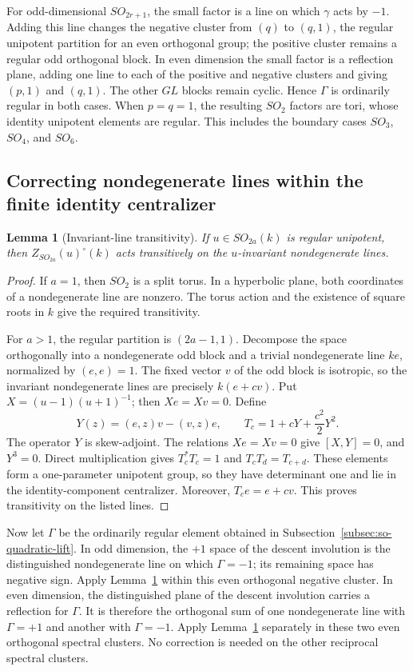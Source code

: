 \documentclass[11pt,a4paper]{article}
\newtheorem{lemma}[theorem]{Lemma}
\theoremstyle{definition}
\theoremstyle{remark}
\begin{document}
For odd-dimensional \(SO_{2r+1}\), the small factor is a line on
which \(\gamma\) acts by \(-1\). Adding this line changes the
negative cluster from \((q)\) to \((q,1)\), the regular
unipotent partition for an even orthogonal group; the positive
cluster remains a regular odd orthogonal block. In even
dimension the small factor is a reflection plane, adding one
line to each of the positive and negative clusters and giving
\((p,1)\) and \((q,1)\). The other \(GL\) blocks remain cyclic.
Hence \(\Gamma\) is ordinarily regular in both cases. When
\(p=q=1\), the resulting \(SO_2\) factors are tori, whose
identity unipotent elements are regular. This includes the
boundary cases \(SO_3\), \(SO_4\), and \(SO_6\).

\subsection{Correcting nondegenerate lines within the finite identity centralizer}
\label{subsec:so-line-correction}

\begin{lemma}[Invariant-line transitivity]\label{lem:so-line}
If \(u\in SO_{2a}(k)\) is regular unipotent, then
\(Z_{SO_{2a}}(u)^\circ(k)\) acts transitively on the
\(u\)-invariant nondegenerate lines.
\end{lemma}

\begin{proof}
If \(a=1\), then \(SO_2\) is a split torus. In a hyperbolic plane,
both coordinates of a nondegenerate line are nonzero. The torus
action and the existence of square roots in \(k\) give the
required transitivity.

For \(a>1\), the regular partition is \((2a-1,1)\). Decompose
the space orthogonally into a nondegenerate odd block and a
trivial nondegenerate line \(ke\), normalized by \((e,e)=1\).
The fixed vector \(v\) of the odd block is isotropic, so the
invariant nondegenerate lines are precisely
\(k(e+cv)\). Put \(X=(u-1)(u+1)^{-1}\); then \(Xe=Xv=0\).
Define
\[
 Y(z)=(e,z)v-(v,z)e,\qquad
 T_c=1+cY+\frac{c^2}{2}Y^2.
\]
The operator \(Y\) is skew-adjoint. The relations \(Xe=Xv=0\)
give \([X,Y]=0\), and \(Y^3=0\). Direct multiplication gives
\(T_c^*T_c=1\) and \(T_cT_d=T_{c+d}\).
These elements form a one-parameter unipotent group, so they
have determinant one and lie in the identity-component
centralizer. Moreover, \(T_ce=e+cv\). This proves transitivity
on the listed lines.
\end{proof}

Now let \(\Gamma\) be the ordinarily regular element obtained
in Subsection~\ref{subsec:so-quadratic-lift}. In odd dimension,
the \(+1\) space of the descent involution is the distinguished
nondegenerate line on which \(\Gamma=-1\); its remaining space
has negative sign. Apply Lemma~\ref{lem:so-line} within this
even orthogonal negative cluster. In even dimension, the
distinguished plane of the descent involution carries a
reflection for \(\Gamma\). It is therefore the orthogonal
sum of one nondegenerate line with \(\Gamma=+1\) and another
with \(\Gamma=-1\). Apply Lemma~\ref{lem:so-line} separately
in these two even orthogonal spectral clusters. No correction
is needed on the other reciprocal spectral clusters.
\end{document}
